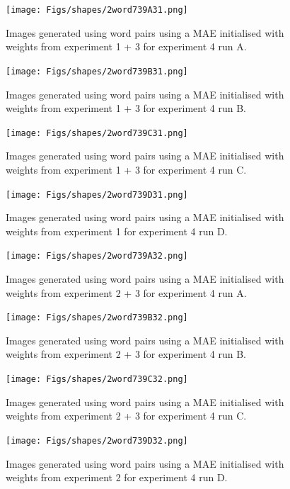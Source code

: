 \begin{figure}
\centering
\texttt{[image: Figs/shapes/2word739A31.png]}
\caption{Images generated using word pairs using a MAE initialised with weights from experiment 1 + 3 for experiment 4 run A.}
\label{fig:2word739A31}
\end{figure}

\begin{figure}
\centering
\texttt{[image: Figs/shapes/2word739B31.png]}
\caption{Images generated using word pairs using a MAE initialised with weights from experiment 1 + 3 for experiment 4 run B.}
\label{fig:2word739B31}
\end{figure}

\begin{figure}
\centering
\texttt{[image: Figs/shapes/2word739C31.png]}
\caption{Images generated using word pairs using a MAE initialised with weights from experiment 1 + 3 for experiment 4 run C.}
\label{fig:2word739C31}
\end{figure}

\begin{figure}
\centering
\texttt{[image: Figs/shapes/2word739D31.png]}
\caption{Images generated using word pairs using a MAE initialised with weights from experiment 1 for experiment 4 run D.}
\label{fig:2word739D31}
\end{figure}





\begin{figure}
\centering
\texttt{[image: Figs/shapes/2word739A32.png]}
\caption{Images generated using word pairs using a MAE initialised with weights from experiment 2 + 3 for experiment 4 run A.}
\label{fig:2word739A32}
\end{figure}

\begin{figure}
\centering
\texttt{[image: Figs/shapes/2word739B32.png]}
\caption{Images generated using word pairs using a MAE initialised with weights from experiment 2 + 3 for experiment 4 run B.}
\label{fig:2word739B32}
\end{figure}

\begin{figure}
\centering
\texttt{[image: Figs/shapes/2word739C32.png]}
\caption{Images generated using word pairs using a MAE initialised with weights from experiment 2 + 3 for experiment 4 run C.}
\label{fig:2word739C32}
\end{figure}

\begin{figure}
\centering
\texttt{[image: Figs/shapes/2word739D32.png]}
\caption{Images generated using word pairs using a MAE initialised with weights from experiment 2 for experiment 4 run D.}
\label{fig:2word739D32}
\end{figure}



